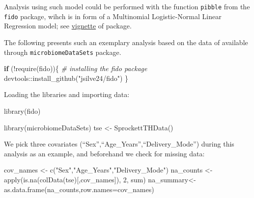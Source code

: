\documentclass[
]{book}
\newenvironment{Shaded}{\begin{snugshade}}{\end{snugshade}}
\newcommand{\AttributeTok}[1]{\textcolor[rgb]{0.77,0.63,0.00}{#1}}
\newcommand{\CommentTok}[1]{\textcolor[rgb]{0.56,0.35,0.01}{\textit{#1}}}
\newcommand{\ControlFlowTok}[1]{\textcolor[rgb]{0.13,0.29,0.53}{\textbf{#1}}}
\newcommand{\DecValTok}[1]{\textcolor[rgb]{0.00,0.00,0.81}{#1}}
\newcommand{\FunctionTok}[1]{\textcolor[rgb]{0.00,0.00,0.00}{#1}}
\newcommand{\NormalTok}[1]{#1}
\newcommand{\OtherTok}[1]{\textcolor[rgb]{0.56,0.35,0.01}{#1}}
\newcommand{\SpecialCharTok}[1]{\textcolor[rgb]{0.00,0.00,0.00}{#1}}
\newcommand{\StringTok}[1]{\textcolor[rgb]{0.31,0.60,0.02}{#1}}
\begin{document}
Analysis using such model could be performed with the function \texttt{pibble} from the \texttt{fido}
package, wihch is in form of a Multinomial Logistic-Normal Linear Regression model; see
\href{https://jsilve24.github.io/fido/articles/introduction-to-fido.html}{vignette} of package.

The following presents such an exemplary analysis based on the
data of \citet{Sprockett2020} available
through \texttt{microbiomeDataSets} package.

\begin{Shaded}
\begin{Highlighting}[]
\ControlFlowTok{if}\NormalTok{ (}\SpecialCharTok{!}\FunctionTok{require}\NormalTok{(fido))\{}
  \CommentTok{\# installing the fido package}
\NormalTok{  devtools}\SpecialCharTok{::}\FunctionTok{install\_github}\NormalTok{(}\StringTok{"jsilve24/fido"}\NormalTok{)}
\NormalTok{\}}
\end{Highlighting}
\end{Shaded}

Loading the libraries and importing data:

\begin{Shaded}
\begin{Highlighting}[]
\FunctionTok{library}\NormalTok{(fido)}
\end{Highlighting}
\end{Shaded}

\begin{Shaded}
\begin{Highlighting}[]
\FunctionTok{library}\NormalTok{(microbiomeDataSets)}
\NormalTok{tse }\OtherTok{\textless{}{-}} \FunctionTok{SprockettTHData}\NormalTok{()}
\end{Highlighting}
\end{Shaded}

We pick three covariates (``Sex'',``Age\_Years'',``Delivery\_Mode'') during this
analysis as an example, and beforehand we check for missing data:

\begin{Shaded}
\begin{Highlighting}[]
\NormalTok{cov\_names }\OtherTok{\textless{}{-}} \FunctionTok{c}\NormalTok{(}\StringTok{"Sex"}\NormalTok{,}\StringTok{"Age\_Years"}\NormalTok{,}\StringTok{"Delivery\_Mode"}\NormalTok{)}
\NormalTok{na\_counts }\OtherTok{\textless{}{-}} \FunctionTok{apply}\NormalTok{(}\FunctionTok{is.na}\NormalTok{(}\FunctionTok{colData}\NormalTok{(tse)[,cov\_names]), }\DecValTok{2}\NormalTok{, sum)}
\NormalTok{na\_summary}\OtherTok{\textless{}{-}}\FunctionTok{as.data.frame}\NormalTok{(na\_counts,}\AttributeTok{row.names=}\NormalTok{cov\_names)}
\end{Highlighting}
\end{Shaded}
\end{document}
